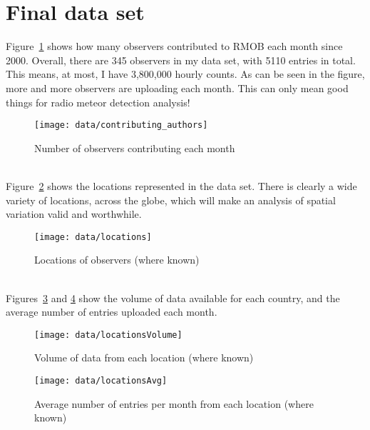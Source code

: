 \section{Final data set}
Figure~\ref{fig:data:contr} shows how many observers contributed to RMOB each month since 2000. Overall, there are 345 observers in my data set, with 5110 entries in total. This means, at most, I have 3,800,000 hourly counts. As can be seen in the figure, more and more observers are uploading each month. This can only mean good things for radio meteor detection analysis!
\begin{figure}[h!]
	\centering
	\texttt{[image: data/contributing\_authors]}
	\caption{Number of observers contributing each month
		\label{fig:data:contr}}
\end{figure}\\
Figure~\ref{fig:data:loc} shows the locations represented in the data set. There is clearly a wide variety of locations, across the globe, which will make an analysis of spatial variation valid and worthwhile. 
\begin{figure}[h!]
	\centering
	\texttt{[image: data/locations]}
	\caption{Locations of observers (where known)
		\label{fig:data:loc}}
\end{figure}\\
Figures~\ref{fig:data:locvol} and \ref{fig:data:locavg} show the volume of data available for each country, and the average number of entries uploaded each month.
\begin{figure}[h!]
	\centering
	\texttt{[image: data/locationsVolume]}
	\caption{Volume of data from each location (where known)
		\label{fig:data:locvol}}
\end{figure}
\begin{figure}[h!]
	\centering
	\texttt{[image: data/locationsAvg]}
	\caption{Average number of entries per month from each location (where known)
		\label{fig:data:locavg}}
\end{figure}